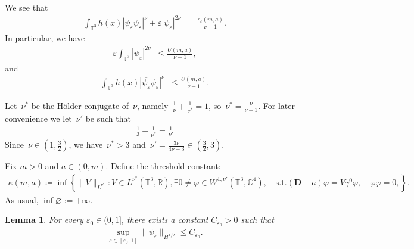 \documentclass[11pt,final]{amsart}
\newcommand{\T}{\mathbb{T}}
\newcommand{\dd}{\mathop{}\!\mathrm{d}}
\newcommand{\eps}{\varepsilon}
\newcommand{\pD}{\mathbf{D}}
\DeclareMathOperator{\dv}{\dd{vol}}
\newtheorem{lemma}[thm]{Lemma}
\begin{document}
We see that
\begin{align}
    \int_{\mathbb{T}^3} h(x)|\bar{\psi}_\eps\psi_\eps|^{\nu}+ \eps|\psi_{\eps}|^{2\nu}\dv=\frac{c_\eps(m,a)}{\nu-1}.
\end{align}
In particular, we have
\begin{align}
\eps
\int_{\T^3}
|\psi_{\eps}|^{2\nu}
\dv
\le
\frac{U(m,a)}{\nu-1},
\end{align}
and
\begin{align}
\int_{\T^3}
h(x)|\overline{\psi_{\eps}}\psi_{\eps}|^\nu
\dv
\le
\frac{U(m,a)}{\nu-1}.
\end{align}




Let~$\nu^*$ be the H\"{o}lder conjugate of~$\nu$, namely~$\frac{1}{\nu}+\frac{1}{\nu^*}=1$, so~$\nu^*=\frac{\nu}{\nu-1}$.
For later convenience we let~$\nu'$ be such that
\begin{align}
    \frac{1}{3} +\frac{1}{\nu^*}=\frac{1}{\nu'}
\end{align}
Since~$\nu\in (1,\frac{3}{2})$, we have~$\nu^*>3$ and~$\nu'=\frac{3\nu}{4\nu-3}\in (\frac{3}{2},3)$.




Fix $m>0$ and $a\in(0,m)$. Define the threshold constant:
\begin{align}\label{the threshold constant}
\kappa(m,a)\coloneqq \inf\left\{
\|V\|_{L^{\nu^*}}: V\in L^{\nu^*}(\mathbb T^3,\mathbb R),
\exists 0\neq\varphi\in W^{1,\nu'}(\T^3,\mathbb C^4), \quad \mbox{s.t.}
(\pD-a)\varphi=V\gamma^0\varphi, \quad  \bar\varphi\varphi=0,
\right\}.
\end{align}
As usual, $\inf\varnothing:=+\infty$.

\begin{lemma}
 For every $\eps_0\in(0,1]$, there exists a constant $C_{\eps_0}>0$ such that
\begin{align}
 \sup_{\eps\in[\eps_0,1]}
 \|\psi_\eps\|_{H^{1/2}}
\le C_{\eps_0}.
\end{align}
\end{lemma}
\end{document}
